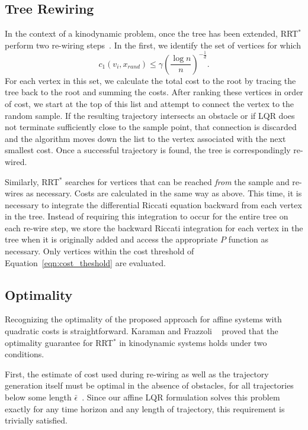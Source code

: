 \documentclass[letterpaper, 10pt, english, conference]{IEEEtran}
\begin{document}
\subsection{Tree Rewiring}

In the context of a kinodynamic problem, once the tree has been
extended, RRT$^*$ perform two re-wiring steps~\cite{Karaman.Frazzoli:CDC10}. In
the first, we identify the set of vertices for which
\begin{equation}
c_1(v_i,x_{rand}) \leq \gamma \left( \frac{\log n}{n} \right)^{-\frac{1}{d}}.
\label{eqn:cost_theshold}
\end{equation}
For each vertex in this set, we calculate the total cost to the root
by tracing the tree back to the root and summing the costs. After
ranking these vertices in order of cost, we start at the top of this
list and attempt to connect the vertex to the random sample. If the
resulting trajectory intersects an obstacle or if LQR does not
terminate sufficiently close to the sample point, that connection is
discarded and the algorithm moves down the list to the vertex
associated with the next smallest cost. Once a successful trajectory
is found, the tree is correspondingly re-wired.

Similarly, RRT$^*$ searches for vertices that can be reached {\em
  from} the sample and re-wires as necessary. Costs are calculated in
the same way as above. This time, it is necessary to integrate the
differential Riccati equation backward from each vertex in the
tree. Instead of requiring this integration to occur for the entire
tree on each re-wire step, we store the backward Riccati integration
for each vertex in the tree when it is originally added and access the
appropriate $P$ function as necessary. Only vertices within the cost
threshold of Equation~\ref{eqn:cost_theshold} are evaluated.


\subsection{Optimality}

Recognizing the optimality of the proposed approach for affine systems
with quadratic costs
is straightforward. 
Karaman and Frazzoli ~\cite{Karaman.Frazzoli:CDC10} proved
that the optimality guarantee for RRT$^*$
in kinodynamic systems holds under two
conditions. 

First, the estimate of cost used during re-wiring as well as
the trajectory generation itself must be optimal in the absence of
obstacles, for all trajectories below some length $\bar\epsilon$~\cite{Karaman.Frazzoli:CDC10}.
Since our affine LQR formulation solves this problem exactly for any time horizon
and any length of trajectory, this requirement is trivially satisfied. 
\end{document}

